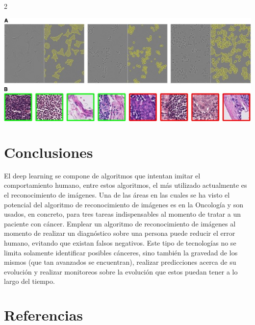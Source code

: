 \documentclass[12pt,spanish,Letterpaper,openany]{book}
\begin{document}
\begin {multicols}{2}
\begin {flushleft}
\begin{minipage}[c]{\columnwidth}
\begin{center}\includegraphics[width=1\linewidth]{imagenes_articulos/sp21_03} \end{center}

\end{minipage}
\end {flushleft}

\hypertarget{conclusiones}{%
\section{Conclusiones}\label{conclusiones}}

El deep learning se compone de algoritmos que intentan imitar el comportamiento humano, entre estos algoritmos, el más utilizado actualmente es el reconocimiento de imágenes. Una de las áreas en las cuales se ha visto el potencial del algoritmo de reconocimiento de imágenes es en la Oncología y son usados, en concreto, para tres tareas indispensables al momento de tratar a un paciente con cáncer. Emplear un algoritmo de reconocimiento de imágenes al momento de realizar un diagnóstico sobre una persona puede reducir el error humano, evitando que existan falsos negativos. Este tipo de tecnologías no se limita solamente identificar posibles cánceres, sino también la gravedad de los mismos (que tan avanzados se encuentran), realizar predicciones acerca de su evolución y realizar monitoreos sobre la evolución que estos puedan tener a lo largo del tiempo.

\hypertarget{referencias}{%
\section{Referencias}\label{referencias}}


\end{multicols}
\end{document}
